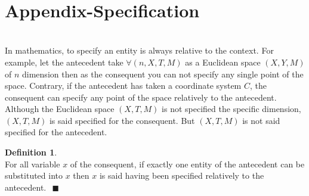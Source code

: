 \newqed\documentclass{article}
\theoremstyle{definition}
\newtheorem{definition}{Definition}[section]
\newcommand{\newspc}{\textcolor{white}{s}}
\newcommand{\newqed}{\newspc{\hfill\color{ocre}\ensuremath{\blacksquare}}}
\begin{document}
\pagebreak
\\
\section{Appendix-Specification}
\\In mathematics, to specify an entity is always relative to the context. For example, let the antecedent take $\forall (n,X,T,M)$ as a Euclidean space $(X,Y,M)$ of  $n$ dimension then as the consequent you can not specify any single point of the space. Contrary, if the antecedent has taken a coordinate system $C$, the consequent can specify any point of the space relatively to the antecedent. 
\\Although the Euclidean space $(X,T,M)$ is not specified the specific dimension, $(X,T,M)$ is said specified for the consequent. But $(X,T,M)$ is not said specified for the antecedent.

\begin{definition}
\\For all variable $x$ of the consequent, if exactly one entity of the antecedent can be substituted into $x$ then $x$ is said having been specified relatively to the antecedent. 
\newqed
\end{definition}






\end{document}
